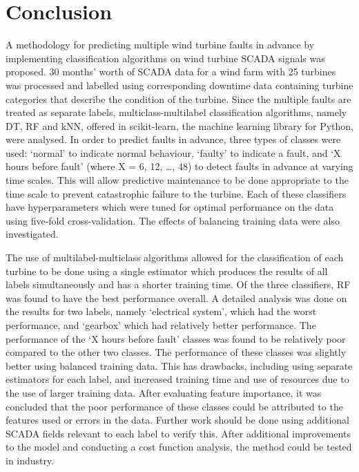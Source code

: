 \chapter{Conclusion}\label{c5}

A methodology for predicting multiple wind turbine faults in advance by implementing classification algorithms on wind turbine SCADA signals was proposed. 30 months' worth of SCADA data for a wind farm with 25 turbines was processed and labelled using corresponding downtime data containing turbine categories that describe the condition of the turbine. Since the multiple faults are treated as separate labels, multiclass-multilabel classification algorithms, namely DT, RF and kNN, offered in scikit-learn, the machine learning library for Python, were analysed. In order to predict faults in advance, three types of classes were used: `normal' to indicate normal behaviour, `faulty' to indicate a fault, and `X hours before fault' (where X = 6, 12, \dots, 48) to detect faults in advance at varying time scales. This will allow predictive maintenance to be done appropriate to the time scale to prevent catastrophic failure to the turbine. Each of these classifiers have hyperparameters which were tuned for optimal performance on the data using five-fold cross-validation. The effects of balancing training data were also investigated.

The use of multilabel-multiclass algorithms allowed for the classification of each turbine to be done using a single estimator which produces the results of all labels simultaneously and has a shorter training time. Of the three classifiers, RF was found to have the best performance overall. A detailed analysis was done on the results for two labels, namely `electrical system', which had the worst performance, and `gearbox' which had relatively better performance. The performance of the `X hours before fault' classes was found to be relatively poor compared to the other two classes. The performance of these classes was slightly better using balanced training data. This has drawbacks, including using separate estimators for each label, and increased training time and use of resources due to the use of larger training data. After evaluating feature importance, it was concluded that the poor performance of these classes could be attributed to the features used or errors in the data. Further work should be done using additional SCADA fields relevant to each label to verify this. After additional improvements to the model and conducting a cost function analysis, the method could be tested in industry.
